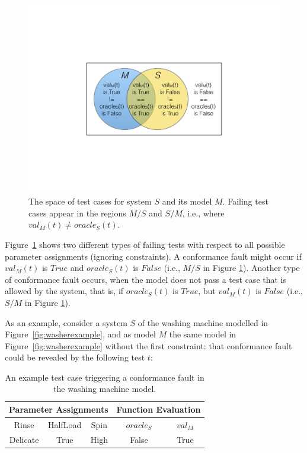 \begin{tikzborder}{\cite{Gargantini16:validation}}
\begin{tikzborder}{\cite{gargantini_combinatorial_2017}}
\begin{tikzborder}{\cite{gargantini_combinatorial_2017}}
\begin{figure}[h]
	\begin{center}
		\includegraphics[width=0.6\columnwidth]{images/venndiagram.pdf}
	\end{center}
	\caption{The space of test cases for system $S$ and its model $M$. Failing test cases appear in the regions $M / S$ and $S / M$, i.e., where $val_{M}(t) \neq \mathit{oracle}_{S}(t)$.}
	\label{fig:correctAndFaults}
\end{figure}

\bb 
Figure~\ref{fig:correctAndFaults} shows two different types of failing tests with respect to all possible parameter assignments (ignoring constraints). 
A conformance fault might occur if $val_{M}(t)$ is $\mathit{True}$ and $\mathit{oracle}_{S}(t)$ is $\mathit{False}$ (i.e., $M/S$ in Figure \ref{fig:correctAndFaults}). Another type of conformance fault occurs, when the model does not pass a test case that is allowed by the system, that is, if $\mathit{oracle}_{S}(t)$ is $\mathit{True}$, but $val_{M}(t)$ is $\mathit{False}$ (i.e., $S/M$ in Figure \ref{fig:correctAndFaults}).\be
\begin{example}
	\bb As an example, consider a system $S$ of the washing machine modelled in Figure~\ref{fig:washerexample}, and as model $M$ the same model in Figure~\ref{fig:washerexample} without the first constraint: that conformance fault could be revealed by the following test $t$:\be
	
	\begin{table}[h]
		\centering
		\begin{tabular}{ccc|cc}
			\multicolumn{3}{c|}{Parameter Assignments} & \multicolumn{2}{c}{Function Evaluation} \\ 
			\hline
			Rinse & HalfLoad & Spin & $\mathit{oracle}_{S}$ & $val_M$ \\
			\hline 
			Delicate & True & High & False & True \\ 
		\end{tabular} \label{tab:conformanceFaultExample} \caption{An example test case triggering a conformance fault in the washing machine model.}
		\label{ex:conformancefault}
	\end{table}
\end{example}


\end{tikzborder}
\end{tikzborder}
\end{tikzborder}
